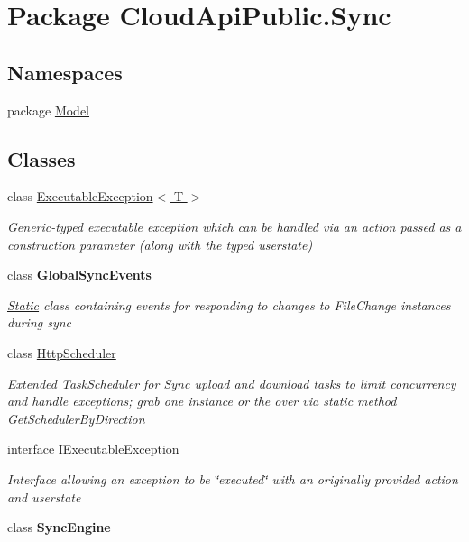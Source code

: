 \hypertarget{namespace_cloud_api_public_1_1_sync}{\section{Package Cloud\-Api\-Public.\-Sync}
\label{namespace_cloud_api_public_1_1_sync}
}
\subsection*{Namespaces}
\begin{DoxyCompactItemize}
\item 
package \hyperlink{namespace_cloud_api_public_1_1_sync_1_1_model}{Model}
\end{DoxyCompactItemize}
\subsection*{Classes}
\begin{DoxyCompactItemize}
\item 
class \hyperlink{class_cloud_api_public_1_1_sync_1_1_executable_exception_3_01_t_01_4}{Executable\-Exception$<$ T $>$}
\begin{DoxyCompactList}\small\item\em Generic-\/typed executable exception which can be handled via an action passed as a construction parameter (along with the typed userstate) \end{DoxyCompactList}\item 
class {\bfseries Global\-Sync\-Events}
\begin{DoxyCompactList}\small\item\em \hyperlink{namespace_cloud_api_public_1_1_static}{Static} class containing events for responding to changes to File\-Change instances during sync \end{DoxyCompactList}\item 
class \hyperlink{class_cloud_api_public_1_1_sync_1_1_http_scheduler}{Http\-Scheduler}
\begin{DoxyCompactList}\small\item\em Extended Task\-Scheduler for \hyperlink{namespace_cloud_api_public_1_1_sync}{Sync} upload and download tasks to limit concurrency and handle exceptions; grab one instance or the over via static method Get\-Scheduler\-By\-Direction \end{DoxyCompactList}\item 
interface \hyperlink{interface_cloud_api_public_1_1_sync_1_1_i_executable_exception}{I\-Executable\-Exception}
\begin{DoxyCompactList}\small\item\em Interface allowing an exception to be \char`\"{}executed\char`\"{} with an originally provided action and userstate \end{DoxyCompactList}\item 
class {\bfseries Sync\-Engine}
\end{DoxyCompactItemize}

